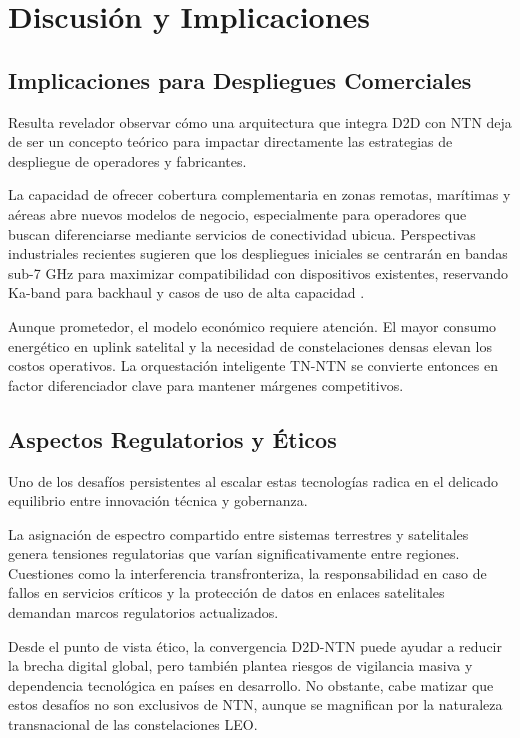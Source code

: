\section{Discusión y Implicaciones}

\subsection{Implicaciones para Despliegues Comerciales}

Resulta revelador observar cómo una arquitectura que integra D2D con NTN deja de ser un concepto teórico para impactar directamente las estrategias de despliegue de operadores y fabricantes. 

La capacidad de ofrecer cobertura complementaria en zonas remotas, marítimas y aéreas abre nuevos modelos de negocio, especialmente para operadores que buscan diferenciarse mediante servicios de conectividad ubicua. Perspectivas industriales recientes sugieren que los despliegues iniciales se centrarán en bandas sub-7 GHz para maximizar compatibilidad con dispositivos existentes, reservando Ka-band para backhaul y casos de uso de alta capacidad \cite{Ericsson2025_NTN}.

Aunque prometedor, el modelo económico requiere atención. El mayor consumo energético en uplink satelital y la necesidad de constelaciones densas elevan los costos operativos. La orquestación inteligente TN-NTN se convierte entonces en factor diferenciador clave para mantener márgenes competitivos.

\subsection{Aspectos Regulatorios y Éticos}

Uno de los desafíos persistentes al escalar estas tecnologías radica en el delicado equilibrio entre innovación técnica y gobernanza. 

La asignación de espectro compartido entre sistemas terrestres y satelitales genera tensiones regulatorias que varían significativamente entre regiones. Cuestiones como la interferencia transfronteriza, la responsabilidad en caso de fallos en servicios críticos y la protección de datos en enlaces satelitales demandan marcos regulatorios actualizados. 

Desde el punto de vista ético, la convergencia D2D-NTN puede ayudar a reducir la brecha digital global, pero también plantea riesgos de vigilancia masiva y dependencia tecnológica en países en desarrollo. No obstante, cabe matizar que estos desafíos no son exclusivos de NTN, aunque se magnifican por la naturaleza transnacional de las constelaciones LEO.

